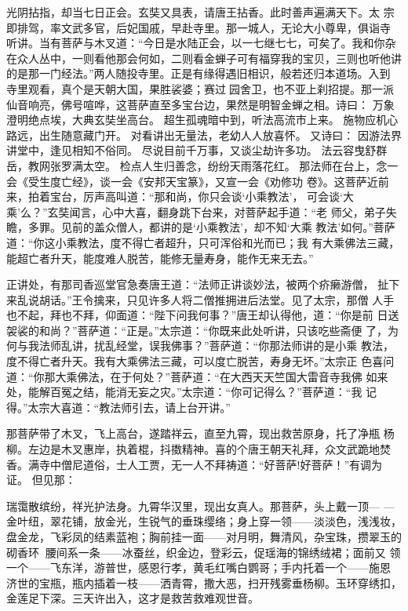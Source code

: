 光阴拈指，却当七日正会。玄奘又具表，请唐王拈香。此时善声遍满天下。太
宗即排驾，率文武多官，后妃国戚，早赴寺里。那一城人，无论大小尊卑，俱诣寺
听讲。当有菩萨与木叉道：“今日是水陆正会，以一七继七七，可矣了。我和你杂
在众人丛中，一则看他那会何如，二则看金蝉子可有福穿我的宝贝，三则也听他讲
的是那一门经法。”两人随投寺里。正是有缘得遇旧相识，般若还归本道场。入到
寺里观看，真个是天朝大国，果胜裟婆；赛过园舍卫，也不亚上刹招提。那一派
仙音响亮，佛号喧哗，这菩萨直至多宝台边，果然是明智金蝉之相。诗曰：
万象澄明绝点埃，大典玄奘坐高台。
超生孤魂暗中到，听法高流市上来。
施物应机心路远，出生随意藏门开。
对看讲出无量法，老幼人人放喜怀。
又诗曰：
因游法界讲堂中，逢见相知不俗同。
尽说目前千万事，又谈尘劫许多功。
法云容曳舒群岳，教网张罗满太空。
检点人生归善念，纷纷天雨落花红。
那法师在台上，念一会《受生度亡经》，谈一会《安邦天宝篆》，又宣一会《劝修功
卷》。这菩萨近前来，拍着宝台，厉声高叫道：“那和尚，你只会谈‘小乘教法’，
可会谈‘大乘’么？”玄奘闻言，心中大喜，翻身跳下台来，对菩萨起手道：“老
师父，弟子失瞻，多罪。见前的盖众僧人，都讲的是‘小乘教法’，却不知‘大乘
教法’如何。”菩萨道：“你这小乘教法，度不得亡者超升，只可浑俗和光而已；我
有大乘佛法三藏，能超亡者升天，能度难人脱苦，能修无量寿身，能作无来无去。”

正讲处，有那司香巡堂官急奏唐王道：“法师正讲谈妙法，被两个疥癞游僧，
扯下来乱说胡话。”王令擒来，只见许多人将二僧推拥进后法堂。见了太宗，那僧
人手也不起，拜也不拜，仰面道：“陛下问我何事？”唐王却认得他，道：“你是前
日送袈裟的和尚？”菩萨道：“正是。”太宗道：“你既来此处听讲，只该吃些斋便
了，为何与我法师乱讲，扰乱经堂，误我佛事？”菩萨道：“你那法师讲的是小乘
教法，度不得亡者升天。我有大乘佛法三藏，可以度亡脱苦，寿身无坏。”太宗正
色喜问道：“你那大乘佛法，在于何处？”菩萨道：“在大西天天竺国大雷音寺我佛
如来处，能解百冤之结，能消无妄之灾。”太宗道：“你可记得么？”菩萨道：“我
记得。”太宗大喜道：“教法师引去，请上台开讲。”

那菩萨带了木叉，飞上高台，遂踏祥云，直至九霄，现出救苦原身，托了净瓶
杨柳。左边是木叉惠岸，执着棍，抖擞精神。喜的个唐王朝天礼拜，众文武跪地焚
香。满寺中僧尼道俗，士人工贾，无一人不拜祷道：“好菩萨!好菩萨！”有调为证。
但见那：

瑞霭散缤纷，祥光护法身。九霄华汉里，现出女真人。那菩萨，头上戴一顶—
—金叶纽，翠花铺，放金光，生锐气的垂珠缨络；身上穿一领——淡淡色，浅浅妆，
盘金龙，飞彩凤的结素蓝袍；胸前挂一面——对月明，舞清风，杂宝珠，攒翠玉的
砌香环；腰间系一条——冰蚕丝，织金边，登彩云，促瑶海的锦绣绒裙；面前又
领一个——飞东洋，游普世，感恩行孝，黄毛红嘴白鹦哥；手内托着一个——施恩
济世的宝瓶，瓶内插着一枝——洒青霄，撒大恶，扫开残雾垂杨柳。玉环穿绣扣，
金莲足下深。三天许出入，这才是救苦救难观世音。

